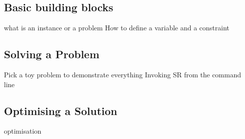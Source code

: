 \subsection{Basic building blocks}
 what is an instance or a problem
How to define a variable and a constraint

\subsection{Solving a Problem}
Pick a toy problem to demonstrate everything
Invoking SR from the command line

\subsection{Optimising a Solution}
optimisation




